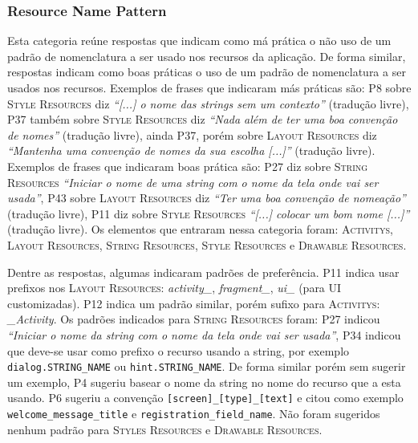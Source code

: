\subsubsection{Resource Name Pattern}
Esta categoria re\'une respostas que indicam como m\'a pr\'atica o n\~ao uso de um padr\~ao de nomenclatura a ser usado nos recursos da aplica\c{c}\~ao. De forma similar, respostas indicam como boas pr\'aticas o uso de um padr\~ao de nomenclatura a ser usados nos recursos. Exemplos de frases que indicaram m\'as pr\'aticas s\~ao: P8 sobre \textsc{Style Resources} diz \textit{``[...] o nome das strings sem um contexto''} (tradu\c{c}\~ao livre), P37 tamb\'em sobre \textsc{Style Resources} diz \textit{``Nada al\'em de ter uma boa conven\c{c}\~ao de nomes''} (tradu\c{c}\~ao livre), ainda P37, por\'em sobre \textsc{Layout Resources} diz \textit{``Mantenha uma conven\c{c}\~ao de nomes da sua escolha [...]''} (tradu\c{c}\~ao livre). Exemplos de frases que indicaram boas pr\'atica s\~ao: P27 diz sobre \textsc{String Resources} \textit{``Iniciar o nome de uma string com o nome da tela onde vai ser usada''}, P43 sobre \textsc{Layout Resources} diz \textit{``Ter uma boa conven\c{c}\~ao de nomea\c{c}\~ao''} (tradu\c{c}\~ao livre), P11 diz sobre \textsc{Style Resources} \textit{``[...] colocar um bom nome [...]''} (tradu\c{c}\~ao livre). Os elementos que entraram nessa categoria foram: \textsc{Activitys}, \textsc{Layout Resources}, \textsc{String Resources}, \textsc{Style Resources} e \textsc{Drawable Resources}. 

Dentre as respostas, algumas indicaram padr\~oes de prefer\^encia. P11 indica usar prefixos nos \textsc{Layout Resources}: \textit{activity\_}, \textit{fragment\_}, \textit{ui\_} (para UI customizadas). P12 indica um padr\~ao similar, por\'em sufixo para \textsc{Activitys}: \textit{\_Activity}. Os padr\~oes indicados para \textsc{String Resources} foram: P27 indicou \textit{``Iniciar o nome da string com o nome da tela onde vai ser usada''}, P34 indicou que deve-se usar como prefixo o recurso usando a string, por exemplo \texttt{dialog.STRING\_NAME} ou \texttt{hint.STRING\_NAME}. De forma similar por\'em sem sugerir um exemplo, P4 sugeriu basear o nome da string no nome do recurso que a esta usando. P6 sugeriu a conven\c{c}\~ao \texttt{[screen]\_[type]\_[text]} e citou como exemplo \texttt{welcome\_message\_title} e \texttt{registration\_field\_name}. N\~ao foram sugeridos nenhum padr\~ao para \textsc{Styles Resources} e \textsc{Drawable Resources}.




